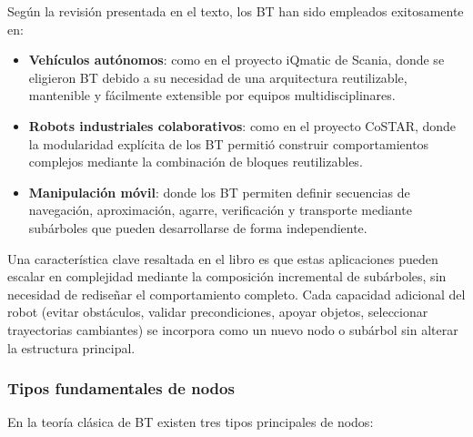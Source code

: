 \documentclass{prgrado}
\begin{document}
Según la revisión presentada en el texto, los BT han sido empleados exitosamente en:

\begin{itemize}
    \item \textbf{Vehículos autónomos}: como en el proyecto iQmatic de Scania, donde se eligieron BT debido a su necesidad de una arquitectura reutilizable, mantenible y fácilmente extensible por equipos multidisciplinares.
    \item \textbf{Robots industriales colaborativos}: como en el proyecto CoSTAR, donde la modularidad explícita de los BT permitió construir comportamientos complejos mediante la combinación de bloques reutilizables.
    \item \textbf{Manipulación móvil}: donde los BT permiten definir secuencias de navegación, aproximación, agarre, verificación y transporte mediante subárboles que pueden desarrollarse de forma independiente.
\end{itemize}

Una característica clave resaltada en el libro es que estas aplicaciones pueden escalar en complejidad mediante la composición incremental de subárboles, sin necesidad de rediseñar el comportamiento completo. Cada capacidad adicional del robot (evitar obstáculos, validar precondiciones, apoyar objetos, seleccionar trayectorias cambiantes) se incorpora como un nuevo nodo o subárbol sin alterar la estructura principal.

\subsubsection{Tipos fundamentales de nodos}

En la teoría clásica de BT existen tres tipos principales de nodos:
\end{document}
